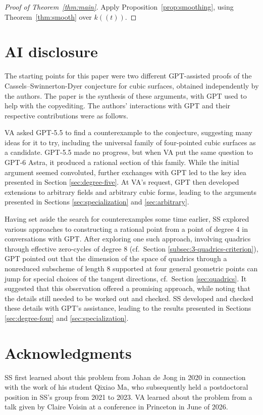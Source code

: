 \documentclass[a4paper,11pt]{amsart}
\numberwithin{equation}{section}
\theoremstyle{definition}
\theoremstyle{remark}
\begin{document}
\begin{proof}[Proof of Theorem~\ref{thm:main}]
Apply Proposition~\ref{prop:smoothing}, using Theorem~\ref{thm:smooth}
over $k((t))$.
\end{proof}
 

\section*{AI disclosure} 
The starting points for this paper were two different 
GPT-assisted proofs of the Cassels--Swinnerton-Dyer conjecture for cubic surfaces, obtained independently by the authors. The paper is the synthesis of these arguments, with GPT used to help with the copyediting.
The authors’ interactions with GPT and their respective 
contributions were as follows. 

VA asked GPT-5.5 to find a 
counterexample to the conjecture,  
suggesting many ideas for it to try,
including the universal family
of four-pointed cubic surfaces as a candidate. 
GPT-5.5 made no progress, but when VA put the same question to 
GPT-6 Astra, it produced a rational section of this family. 
While the initial argument seemed convoluted, further exchanges 
with GPT led to the key idea presented 
in Section \ref{sec:degree-five}.
At VA’s request, GPT then developed extensions to arbitrary 
fields and arbitrary cubic forms, leading to the arguments 
presented in Sections \ref{sec:specialization} and \ref{sec:arbitrary}.  

Having set aside the search for counterexamples some time 
earlier, SS explored various approaches to constructing a 
rational point from a point of degree $4$ in conversations with 
GPT. After exploring one such approach, involving quadrics through effective 
zero-cycles of degree $8$ (cf.~Section \ref{subsec:3-quadrics-criterion}), 
GPT pointed out that the dimension 
of the space of quadrics through a nonreduced subscheme of 
length $8$ supported at four general geometric points can jump for 
special choices of the tangent directions, 
cf.~Section \ref{sec:quadrics}. It suggested 
that this observation offered a promising approach, 
while noting that the details still needed to be worked 
out and checked. SS developed and checked these details 
with GPT’s assistance, leading to the results presented 
in Sections \ref{sec:degree-four} and \ref{sec:specialization}.  


\section*{Acknowledgments} 
SS first learned about this problem from Johan de Jong in 2020 in connection with the work of his student Qixiao Ma, who subsequently held a postdoctoral position in SS's group from 2021 to 2023.  
VA learned about the problem from a talk given by Claire Voisin at a conference in Princeton in June of 2026.
\end{document}
